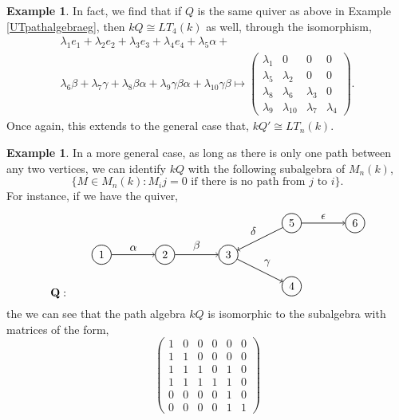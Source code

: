 \documentclass[11.5pt, twoside, a4paper, titlepage]{report}
\providecommand{\equ}[0]{\begin{equation*}}
\providecommand{\eequ}[0] {\end{equation*}}
\theoremstyle{definition}
\newtheorem{eg}[mydef]{Example}
\theoremstyle{plain}
\begin{document}
\begin{eg}
In fact, we find that if $Q$ is the same quiver as above in Example \ref{UTpathalgebraeg}, then $kQ \cong LT_4(k)$ as well, through the isomorphism,
\begin{multline*}
\lambda_1e_1+\lambda_2e_2+\lambda_3e_3+\lambda_4e_4+\lambda_5\alpha+\\
\lambda_6\beta+\lambda_7\gamma+\lambda_8\beta\alpha+\lambda_9\gamma\beta\alpha+\lambda_{10}\gamma\beta
\mapsto
\begin{pmatrix*}
\lambda_1 & 0 & 0 & 0\\
\lambda_5 & \lambda_2 & 0 & 0\\
\lambda_8 & \lambda_6 & \lambda_3 & 0\\
\lambda_9 & \lambda_{10} & \lambda_7 & \lambda_4
\end{pmatrix*}.
\end{multline*}
Once again, this extends to the general case that, $kQ' \cong LT_n(k)$.
\end{eg}

\begin{eg} \label{pathalgebramatrixeg}
In a more general case, as long as there is only one path between any two vertices, we can identify $kQ$ with the following subalgebra of $M_n(k)$,
\equ
\{M \in M_n(k): M_ij=0 \text{ if there is no path from } j \text{ to }i\}.
\eequ
For instance, if we have the quiver,
\equ
\mathbf{Q}: \qquad
\begin{tikzpicture}[->,-latex, auto, every path/.style={->, semithick}, main node/.style={draw, circle}]
\node	[main node]		(1) at (0,0)		{1};
\node [main node]		(2) at (2,0)		{2};
\node [main node]		(3) at (4,0)		{3};
\node [main node]		(4) at (6,-1)		{4};
\node [main node]		(5) at (6,1)		{5};
\node [main node]		(6) at (8, 1)		{6};

\draw (1) edge node [auto] {$\alpha$} (2);
\draw (2) edge node [auto] {$\beta$} (3);
\draw (3) edge node [auto] {$\gamma$} (4);
\draw (5) edge node [auto, swap] {$\delta$} (3);
\draw (5) edge node [auto] {$\epsilon$} (6);
\end{tikzpicture}
\eequ
the we can see that the path algebra $kQ$ is isomorphic to the subalgebra with matrices of the form,
\equ
\begin{pmatrix*}
1 & 0 & 0 & 0 & 0 & 0 \\
1 & 1 & 0 & 0 & 0 & 0 \\
1 & 1 & 1 & 0 & 1 & 0 \\
1 & 1 & 1 & 1 & 1 & 0 \\
0 & 0 & 0 & 0 & 1 & 0 \\
0 & 0 & 0 & 0 & 1 & 1
\end{pmatrix*}
\eequ
\end{eg}
\end{document}
